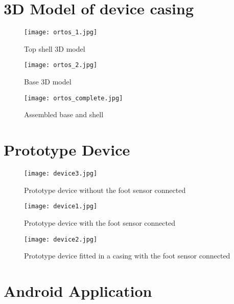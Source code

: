 \chapter{3D Model of device casing}
\makeatletter{}\makeatother
\label{appen:3dmodel}

\begin{figure}[!htb]
  \centering
  \texttt{[image: ortos\_1.jpg]}
  \caption{Top shell 3D model}
  \label{fig:CustomTableLayout}
\end{figure}

\begin{figure}[!htb]
  \centering
  \texttt{[image: ortos\_2.jpg]}
  \caption{Base 3D model}
  \label{fig:CustomTableLayout}
\end{figure}

\begin{figure}[!htb]
  \centering
  \texttt{[image: ortos\_complete.jpg]}
  \caption{Assembled base and shell}
  \label{fig:CustomTableLayout}
\end{figure}

\chapter{Prototype Device}
\makeatletter{}\makeatother
\label{appen:prototype}

\begin{figure}[!htb]
  \centering
  \texttt{[image: device3.jpg]}
  \caption{Prototype device without the foot sensor connected}
  \label{fig:CustomTableLayout}
\end{figure}

\begin{figure}[!htb]
  \centering
  \texttt{[image: device1.jpg]}
  \caption{Prototype device with the foot sensor connected}
  \label{fig:CustomTableLayout}
\end{figure}

\begin{figure}[!htb]
  \centering
  \texttt{[image: device2.jpg]}
  \caption{Prototype device fitted in a casing with the foot sensor connected}
  \label{fig:CustomTableLayout}
\end{figure}

\chapter{Android Application}
\makeatletter{}\makeatother
\label{appen:androidapp}

